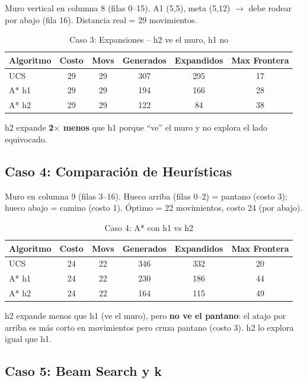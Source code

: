 Muro vertical en columna 8 (filas 0--15). A1 (5,5), meta (5,12) $\to$ debe rodear por abajo
(fila 16). Distancia real = 29 movimientos.

\begin{table}[H]
\centering
\caption{Caso 3: Expansiones -- h2 ve el muro, h1 no}
\begin{tabular}{lccccc}
\toprule
Algoritmo & Costo & Movs & Generados & Expandidos & Max Frontera \\
\midrule
UCS & 29 & 29 & 307 & 295 & 17 \\
A* h1 & 29 & 29 & 194 & 166 & 28 \\
A* h2 & 29 & 29 & 122 & 84 & 38 \\
\bottomrule
\end{tabular}
\end{table}
\label{tab:caso3-expansiones}

h2 expande \textbf{2$\times$ menos} que h1 porque ``ve'' el muro y no explora el lado
equivocado.

\subsection{Caso 4: Comparación de Heurísticas}
\label{sec:caso4}

Muro en columna 9 (filas 3--16). Hueco arriba (filas 0--2) = pantano (costo 3); hueco abajo
= camino (costo 1). Óptimo = 22 movimientos, costo 24 (por abajo).

\begin{table}[H]
\centering
\caption{Caso 4: A* con h1 vs h2}
\begin{tabular}{lccccc}
\toprule
Algoritmo & Costo & Movs & Generados & Expandidos & Max Frontera \\
\midrule
UCS & 24 & 22 & 346 & 332 & 20 \\
A* h1 & 24 & 22 & 230 & 186 & 44 \\
A* h2 & 24 & 22 & 164 & 115 & 49 \\
\bottomrule
\end{tabular}
\end{table}
\label{tab:caso4}

h2 expande menos que h1 (ve el muro), pero \textbf{no ve el pantano}: el atajo por arriba
es más corto en movimientos pero cruza pantano (costo 3). h2 lo explora igual que h1.

\subsection{Caso 5: Beam Search y k}
\label{sec:caso5}

